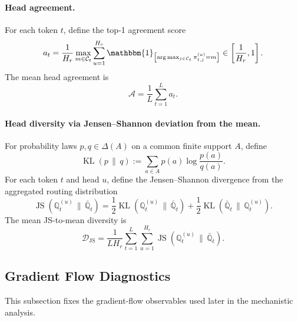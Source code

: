 \documentclass{article}
\theoremstyle{plain}
\theoremstyle{definition}
\theoremstyle{remark}
\begin{document}
\paragraph{Head agreement.}
For each token $t$, define the top-1 agreement score
\begin{equation}
\label{eq:head-agreement-token}
a_t
=
\frac{1}{H_r}
\max_{m\in\mathcal{C}_t}
\sum_{u=1}^{H_r}
\mathbbm{1}_{\left[\arg\max_{j\in\mathcal{C}_t} \pi_{t,j}^{(u)}=m\right]}
\in\left[\frac{1}{H_r},1\right].
\end{equation}
The mean head agreement is
\begin{equation}
\label{eq:head-agreement}
\mathcal A
=
\frac{1}{L}\sum_{t=1}^L a_t.
\end{equation}

\paragraph{Head diversity via Jensen--Shannon deviation from the mean.}
For probability laws $p,q\in\Delta(A)$ on a common finite support $A$, define
\[
\operatorname{KL}(p\,\|\,q)
:=
\sum_{a\in A} p(a)\log\frac{p(a)}{q(a)}.
\]
For each token $t$ and head $u$, define the Jensen--Shannon divergence from the aggregated routing distribution
\begin{equation}
\label{eq:js-divergence}
\operatorname{JS}(\mathbb Q_t^{(u)}\,\|\,\bar{\mathbb Q}_t)
=
\frac{1}{2}\operatorname{KL}(\mathbb Q_t^{(u)}\,\|\,\bar{\mathbb Q}_t)
+
\frac{1}{2}\operatorname{KL}(\bar{\mathbb Q}_t\,\|\,\mathbb Q_t^{(u)}).
\end{equation}
The mean JS-to-mean diversity is
\begin{equation}
\label{eq:js-diversity}
\mathcal D_{\mathrm{JS}}
=
\frac{1}{LH_r}
\sum_{t=1}^L\sum_{u=1}^{H_r}
\operatorname{JS}(\mathbb Q_t^{(u)}\,\|\,\bar{\mathbb Q}_t).
\end{equation}

\subsection{Gradient Flow Diagnostics}
\label{sec:gradient-flow-diagnostics}

This subsection fixes the gradient-flow observables used later in the mechanistic analysis.
\end{document}
